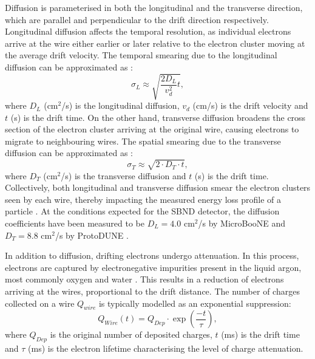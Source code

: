Diffusion is parameterised in both the longitudinal and the transverse direction, which are parallel and perpendicular to the drift direction respectively.
Longitudinal diffusion affects the temporal resolution, as individual electrons arrive at the wire either earlier or later relative to the electron cluster moving at the average drift velocity.
The temporal smearing due to the longitudinal diffusion can be approximated as \cite{uboone_diff}:
\begin{equation}
        \sigma_{L} \approx \sqrt{\frac{2D_L}{v^{2}_{d}}t},
\end{equation}
where $D_L$ (cm$^2$/s) is the longitudinal diffusion, $v_{d}$ (cm/s) is the drift velocity and $t$ (s) is the drift time.
On the other hand, transverse diffusion broadens the cross section of the electron cluster arriving at the original wire, causing electrons to migrate to neighbouring wires.
The spatial smearing due to the transverse diffusion can be approximated as \cite{GrayDiffusion}:
\begin{equation}
        \sigma_T \approx \sqrt{2 \cdot D_T \cdot t},
\end{equation}
where $D_T$ (cm$^2$/s) is the transverse diffusion and $t$ (s) is the drift time.
Collectively, both longitudinal and transverse diffusion smear the electron clusters seen by each wire, thereby impacting the measured energy loss profile of a particle \cite{GrayDiffusion}.
At the conditions expected for the SBND detector, the diffusion coefficients have been measured to be $D_{L} = 4.0 $ cm$^{2}$/s by MicroBooNE \cite{uboone_diff} and $D_T = 8.8 $ cm$^{2}$/s by ProtoDUNE \cite{protodune}.

In addition to diffusion, drifting electrons undergo attenuation.  
In this process, electrons are captured by electronegative impurities present in the liquid argon, most commonly oxygen and water \cite{protodune}.
This results in a reduction of electrons arriving at the wires, proportional to the drift distance. 
The number of charges collected on a wire $Q_{wire}$ is typically modelled as an exponential suppression:
\begin{equation}
	Q_{Wire} (t) = Q_{Dep} \cdot \exp\left(\frac{-t}{\tau}\right),
\label{eq:etime}
\end{equation}
where $Q_{Dep}$ is the original number of deposited charges, $t$ (ms) is the drift time and $\tau$ (ms) is the electron lifetime characterising the level of charge attenuation.

